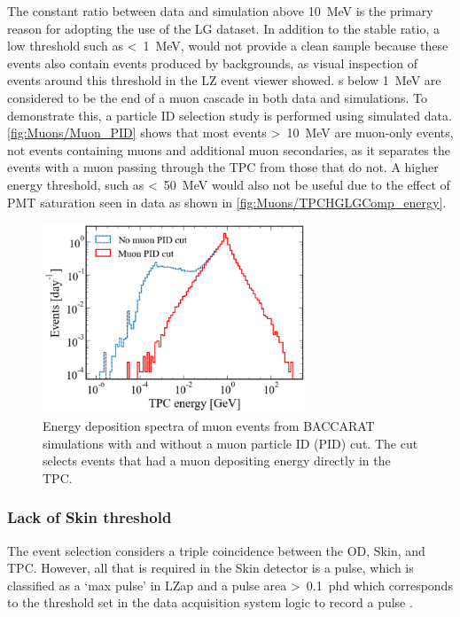 The constant ratio between data and simulation above 10~MeV is the primary reason for adopting the use of the LG dataset. In addition to the stable ratio, a low threshold such as \textless~1~MeV, would not provide a clean sample because these events also contain events produced by backgrounds, as visual inspection of events around this threshold in the LZ event viewer showed. s below 1~MeV are considered to be the end of a muon cascade in both data and simulations. To demonstrate this, a particle ID selection study is performed using simulated data. \autoref{fig:Muons/Muon_PID} shows that most events \textgreater~10~MeV are muon-only events, not events containing muons and additional muon secondaries, as it separates the events with a muon passing through the TPC from those that do not. A higher energy threshold, such as \textless~50~MeV would also not be useful due to the effect of PMT saturation seen in data as shown in \autoref{fig:Muons/TPCHGLGComp_energy}.
\begin{figure}[h!]
    \centering
    \includegraphics[width=0.7\textwidth]{figures/Muons/Muon_pid_cutLZstyle.pdf}
    \caption[Energy deposition spectra of muon events from BACCARAT simulations with and without a muon particle ID (PID) cut.]{Energy deposition spectra of muon events from BACCARAT simulations with and without a muon particle ID (PID) cut. The cut selects events that had a muon depositing energy directly in the TPC.}
    \label{fig:Muons/Muon_PID}
\end{figure}

\subsubsection{Lack of Skin threshold}\label{sec:Muons/MuonFluxSkinThreshold}
The event selection considers a triple coincidence between the OD, Skin, and TPC. However, all that is required in the Skin detector is a pulse, which is classified as a `max pulse' in LZap and a pulse area \textgreater~0.1~phd which corresponds to the threshold set in the data acquisition system logic to record a pulse \cite{LZ:2024bvw}.

